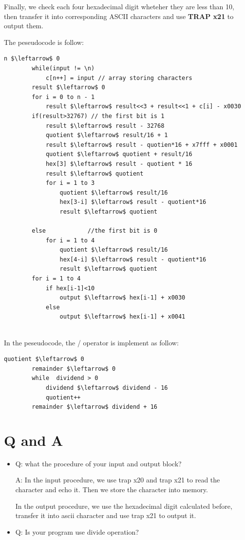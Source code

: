 \documentclass[twoside]{article}
\begin{document}
\begin{CJK*}{UTF8}{gbsn}
	Finally, we check each four hexadecimal digit wheteher they are less than 10, then transfer it into corresponding ASCII characters and use \textbf{TRAP x21} to output them.

	The peseudocode is follow:
	\begin{lstlisting}[mathescape=true]
		n $\leftarrow$ 0
		while(input != \n)
			c[n++] = input // array storing characters
		result $\leftarrow$ 0 
		for i = 0 to n - 1
			result $\leftarrow$ result<<3 + result<<1 + c[i] - x0030
		if(result>32767) // the first bit is 1
			result $\leftarrow$ result - 32768
			quotient $\leftarrow$ result/16 + 1
			result $\leftarrow$ result - quotien*16 + x7fff + x0001
			quotient $\leftarrow$ quotient + result/16
			hex[3] $\leftarrow$ result - quotient * 16 
			result $\leftarrow$ quotient
			for i = 1 to 3
				quotient $\leftarrow$ result/16
				hex[3-i] $\leftarrow$ result - quotient*16
				result $\leftarrow$ quotient
				
		else 			//the first bit is 0
			for i = 1 to 4
				quotient $\leftarrow$ result/16
				hex[4-i] $\leftarrow$ result - quotient*16
				result $\leftarrow$ quotient
		for i = 1 to 4
			if hex[i-1]<10
				output $\leftarrow$ hex[i-1] + x0030
			else 
				output $\leftarrow$ hex[i-1] + x0041
		

	\end{lstlisting}

	In the peseudocode, the / operator is implement as follow:
	
	\begin{lstlisting}[mathescape=true]
		quotient $\leftarrow$ 0
		remainder $\leftarrow$ 0
		while  dividend > 0
			dividend $\leftarrow$ dividend - 16
			quotient++
		remainder $\leftarrow$ dividend + 16
	\end{lstlisting}

	\section{Q and A}
	\begin{itemize}
		\item 	Q: what the procedure of your input and output block?
		
				A: In the input procedure, we use trap x20 and trap x21 to read the character and echo it. Then we store the character into memory.
				
				In the output procedure, we use the hexadecimal digit calculated before, transfer it into ascii character and use trap x21 to output it.
		\item	Q: Is your program use divide operation?
		

\end{itemize}
\end{CJK*}
\end{document}
